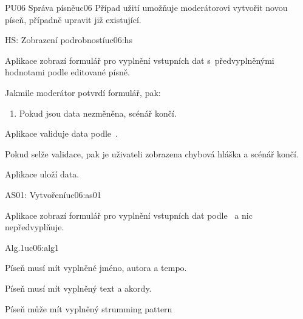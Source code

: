 \begin{usecase}{PU06 Správa písně}{uc06}
    Případ užití umožňuje moderátorovi vytvořit novou píseň, případně upravit již existující.

    \begin{scenario}{HS: Zobrazení podrobností}{uc06:hs}
        \item Aplikace zobrazí formulář pro vyplnění vstupních dat s~předvyplněnými hodnotami podle editované písně.
        \item Jakmile moderátor potvrdí formulář, pak:
        \begin{enumerate}
            \item Pokud jsou data nezměněna, scénář končí.
        \end{enumerate}
        \item Aplikace validuje data podle~.
        \item Pokud selže validace, pak je uživateli zobrazena chybová hláška a scénář končí.
        \item Aplikace uloží data.
    \end{scenario}

    \begin{scenario}{AS01: Vytvoření}{uc06:as01}
        \item Aplikace zobrazí formulář pro vyplnění vstupních dat podle~ a nic nepředvyplňuje.
    \end{scenario}

    \begin{scenario}{Alg.1}{uc06:alg1}
        \item Píseň musí mít vyplněné jméno, autora a tempo.
        \item Píseň musí mít vyplněný text a akordy.
        \item Píseň může mít vyplněný strumming pattern
    \end{scenario}
\end{usecase}
